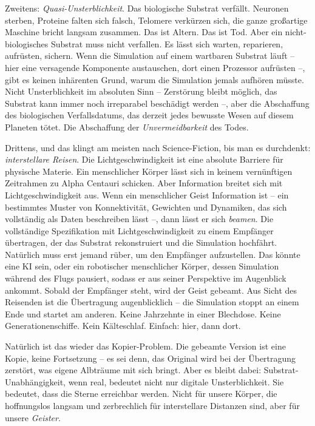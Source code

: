 \documentclass[11pt, twoside, openright]{book}
\begin{document}
Zweitens: \textit{Quasi-Unsterblichkeit}. Das biologische Substrat verfällt. Neuronen sterben, Proteine falten sich falsch, Telomere verkürzen sich, die ganze großartige Maschine bricht langsam zusammen. Das ist Altern. Das ist Tod. Aber ein nicht-biologisches Substrat muss nicht verfallen. Es lässt sich warten, reparieren, aufrüsten, sichern. Wenn die Simulation auf einem wartbaren Substrat läuft -- hier eine versagende Komponente austauschen, dort einen Prozessor aufrüsten --, gibt es keinen inhärenten Grund, warum die Simulation jemals aufhören müsste. Nicht Unsterblichkeit im absoluten Sinn -- Zerstörung bleibt möglich, das Substrat kann immer noch irreparabel beschädigt werden --, aber die Abschaffung des biologischen Verfallsdatums, das derzeit jedes bewusste Wesen auf diesem Planeten tötet. Die Abschaffung der \textit{Unvermeidbarkeit} des Todes.

Drittens, und das klingt am meisten nach Science-Fiction, bis man es durchdenkt: \textit{interstellare Reisen}. Die Lichtgeschwindigkeit ist eine absolute Barriere für physische Materie. Ein menschlicher Körper lässt sich in keinem vernünftigen Zeitrahmen zu Alpha Centauri schicken. Aber Information breitet sich mit Lichtgeschwindigkeit aus. Wenn ein menschlicher Geist Information ist -- ein bestimmtes Muster von Konnektivität, Gewichten und Dynamiken, das sich vollständig als Daten beschreiben lässt --, dann lässt er sich \textit{beamen}. Die vollständige Spezifikation mit Lichtgeschwindigkeit zu einem Empfänger übertragen, der das Substrat rekonstruiert und die Simulation hochfährt. Natürlich muss erst jemand rüber, um den Empfänger aufzustellen. Das könnte eine KI sein, oder ein robotischer menschlicher Körper, dessen Simulation während des Flugs pausiert, sodass er aus seiner Perspektive im Augenblick ankommt. Sobald der Empfänger steht, wird der Geist gebeamt. Aus Sicht des Reisenden ist die Übertragung augenblicklich -- die Simulation stoppt an einem Ende und startet am anderen. Keine Jahrzehnte in einer Blechdose. Keine Generationenschiffe. Kein Kälteschlaf. Einfach: hier, dann dort.

Natürlich ist das wieder das Kopier-Problem. Die gebeamte Version ist eine Kopie, keine Fortsetzung -- es sei denn, das Original wird bei der Übertragung zerstört, was eigene Albträume mit sich bringt. Aber es bleibt dabei: Substrat-Unabhängigkeit, wenn real, bedeutet nicht nur digitale Unsterblichkeit. Sie bedeutet, dass die Sterne erreichbar werden. Nicht für unsere Körper, die hoffnungslos langsam und zerbrechlich für interstellare Distanzen sind, aber für unsere \textit{Geister}.
\end{document}
